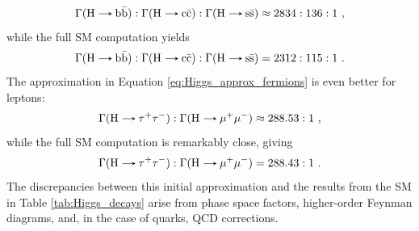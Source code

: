 \begin{equation*}
    \Gamma(\text{H}\decaysto \text{b}\bar{\text{b}}):\Gamma(\text{H}\decaysto \text{c}\bar{\text{c}}):\Gamma(\text{H}\decaysto \text{s}\bar{\text{s}}) \approx  2834:136:1\ ,
\end{equation*}
while the full SM computation yields
\begin{equation*}
    \Gamma(\text{H}\decaysto \text{b}\bar{\text{b}}):\Gamma(\text{H}\decaysto \text{c}\bar{\text{c}}):\Gamma(\text{H}\decaysto \text{s}\bar{\text{s}}) =  2312:115:1\ .
\end{equation*}
The approximation in Equation \eqref{eq:Higgs_approx_fermions} is even better for leptons:
\begin{equation*}
    \Gamma(\text{H}\decaysto \tau^+\tau^-):\Gamma(\text{H}\decaysto \mu^+\mu^-) \approx  288.53:1\ ,
\end{equation*}
while the full SM computation is remarkably close, giving
\begin{equation*}
    \Gamma(\text{H}\decaysto \tau^+\tau^-):\Gamma(\text{H}\decaysto \mu^+\mu^-) =  288.43:1\ .
\end{equation*}
The discrepancies between this initial approximation and the results from the SM in Table \ref{tab:Higgs_decays} arise from phase space factors, higher-order Feynman diagrams, and, in the case of quarks, QCD corrections.


